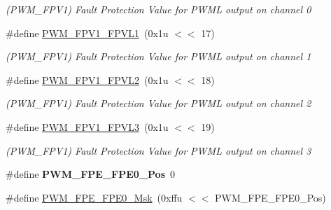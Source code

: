 \begin{DoxyCompactItemize}
\begin{DoxyCompactList}\small\item\em (P\+W\+M\+\_\+\+F\+P\+V1) Fault Protection Value for P\+W\+ML output on channel 0 \end{DoxyCompactList}\item 
\mbox{\label{group__SAMV71__PWM_ga25d587b4254153c0fe30eaa3ef5443e8}} 
\#define \mbox{\hyperlink{group__SAMV71__PWM_ga25d587b4254153c0fe30eaa3ef5443e8}{P\+W\+M\+\_\+\+F\+P\+V1\+\_\+\+F\+P\+V\+L1}}~(0x1u $<$$<$ 17)
\begin{DoxyCompactList}\small\item\em (P\+W\+M\+\_\+\+F\+P\+V1) Fault Protection Value for P\+W\+ML output on channel 1 \end{DoxyCompactList}\item 
\mbox{\label{group__SAMV71__PWM_gafe428a8ac4e577fcc2b578452b10fa4f}} 
\#define \mbox{\hyperlink{group__SAMV71__PWM_gafe428a8ac4e577fcc2b578452b10fa4f}{P\+W\+M\+\_\+\+F\+P\+V1\+\_\+\+F\+P\+V\+L2}}~(0x1u $<$$<$ 18)
\begin{DoxyCompactList}\small\item\em (P\+W\+M\+\_\+\+F\+P\+V1) Fault Protection Value for P\+W\+ML output on channel 2 \end{DoxyCompactList}\item 
\mbox{\label{group__SAMV71__PWM_ga7e0af5cbe9fed2f4df286fc02af113bf}} 
\#define \mbox{\hyperlink{group__SAMV71__PWM_ga7e0af5cbe9fed2f4df286fc02af113bf}{P\+W\+M\+\_\+\+F\+P\+V1\+\_\+\+F\+P\+V\+L3}}~(0x1u $<$$<$ 19)
\begin{DoxyCompactList}\small\item\em (P\+W\+M\+\_\+\+F\+P\+V1) Fault Protection Value for P\+W\+ML output on channel 3 \end{DoxyCompactList}\item 
\mbox{\label{group__SAMV71__PWM_ga44078a843929dc1c69281b78ac024c86}} 
\#define {\bfseries P\+W\+M\+\_\+\+F\+P\+E\+\_\+\+F\+P\+E0\+\_\+\+Pos}~0
\item 
\mbox{\label{group__SAMV71__PWM_ga883b1a6b32d3255fe62e1e584659cb30}} 
\#define \mbox{\hyperlink{group__SAMV71__PWM_ga883b1a6b32d3255fe62e1e584659cb30}{P\+W\+M\+\_\+\+F\+P\+E\+\_\+\+F\+P\+E0\+\_\+\+Msk}}~(0xffu $<$$<$ P\+W\+M\+\_\+\+F\+P\+E\+\_\+\+F\+P\+E0\+\_\+\+Pos)

\end{DoxyCompactItemize}
